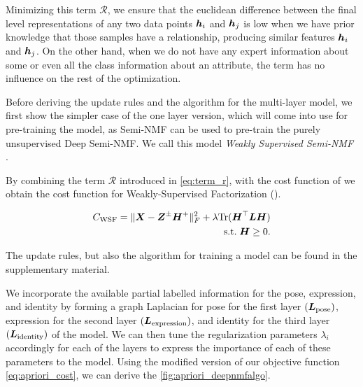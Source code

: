 \documentclass[10pt,journal,compsoc]{IEEEtran}
\begin{document}
Minimizing this term $\mathcal R$, we ensure that the euclidean difference between the final level representations of any two data points $\boldsymbol{h}_i$ and $\boldsymbol{h}_j$ is low when we have prior knowledge that those samples have a relationship, producing similar features $\boldsymbol{h}_i$  and $\boldsymbol{h}_j$. On the other hand, when we do not have any expert information about some or even all the class information about an attribute, the term has no influence on the rest of the optimization.

\label{sec:wsnmf}
Before deriving the update rules and the algorithm for the multi-layer \dwsf{} model, we first show the simpler case of the one layer version, which will come into use for pre-training the model, as Semi-NMF can be used to pre-train the purely unsupervised Deep Semi-NMF. We call this model {\it Weakly Supervised Semi-NMF} \wsf{}. 

By combining the term $\mathcal R$ introduced in \autoref{eq:term_r}, with the cost function of \seminmf we obtain the cost function for Weakly-Supervised Factorization (\wsf).

\begin{align}\notag
C_{\text{WSF}}=\|{\boldsymbol{X}} - {\boldsymbol{Z}^{\pm}}{\boldsymbol{H}^{+}}\|^2_F + \lambda \text{Tr}(\boldsymbol{H}^\top \boldsymbol{L} \boldsymbol{H})\\ \label{eq:obj_wsnmf} \text{s.t.}\; \boldsymbol{H} \geq 0.
\end{align}

 
The update rules, but also the algorithm for training a \wsf model can be found in the supplementary material.

 


We incorporate the available partial labelled information for the pose, expression, and identity by forming a graph Laplacian for pose for the first layer $(\boldsymbol{L}_{\text{pose}})$, expression for the second layer $(\boldsymbol{L}_{\text{expression}})$, and identity for the third layer $(\boldsymbol{L}_{\text{identity}})$ of the model. We can then tune the regularization parameters $\lambda_i$ accordingly for each of the layers to express the importance of each of these parameters to the \dwsf{} model. Using the modified version of our objective function \autoref{eq:apriori_cost}, we can derive the \autoref{fig:apriori_deepnmfalgo}.
\end{document}
